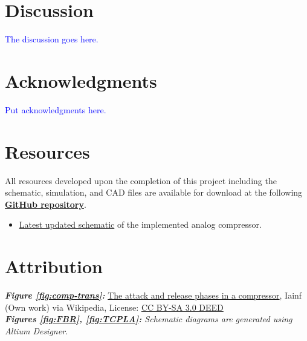 \documentclass[10pt]{article}
\begin{document}
\begin{multicols*}{2}
        \section{Discussion}
            \textcolor{blue}{The discussion goes here.}

        \section*{Acknowledgments}
            \textcolor{blue}{Put acknowledgments here. }

        \section*{Resources}
            All resources developed upon the completion of this project including the schematic, simulation, and CAD files are available for download at the following \textbf{\textcolor{github-butterfly-bush}{\href{https://github.com/ShaunG-RU/DRC-Project}{GitHub repository}}}.
            
            \begin{itemize}
                \item \href{https://github.com/ShaunG-RU/DRC-Project/blob/main/Altium/DRC.pdf}{Latest updated schematic} of the implemented analog compressor.
            \end{itemize}

        \printbibliography

        \section*{Attribution}
            \footnotesize{
                \textit{\textbf{Figure \ref{fig:comp-trans}:}} \href{https://en.wikipedia.org/wiki/Dynamic_range_compression#/media/File:Audio_Compression_Attack_and_Release-2.svg}{The attack and release phases in a compressor}, Iainf (Own work) via Wikipedia, License: \href{https://creativecommons.org/licenses/by-sa/3.0/}{CC BY-SA 3.0 DEED}\\

                \noindent\textit{\textbf{Figures \ref{fig:FBR}, \ref{fig:TCPLA}:} Schematic diagrams are generated using Altium Designer.}\\
            }

        \iffalse
        \begin{figure}[!th]


\end{figure}
\end{multicols*}
\end{document}
